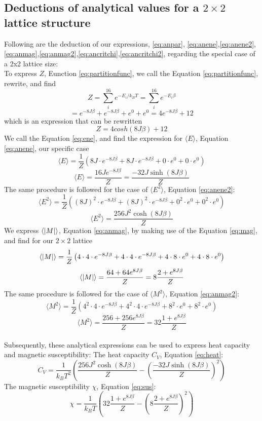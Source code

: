 \documentclass[10pt, nofootinbib, twocolumn]{revtex4-1}
\begin{document}
\subsection{Deductions of analytical values for a $2\times 2$ lattice structure}
Following are the deduction of our expressions, \eqref{eq:anpar}, \eqref{eq:anene},\eqref{eq:anene2},\eqref{eq:anmag},\eqref{eq:anmag2},\eqref{eq:ancritchi},\eqref{eq:ancritchi2}, regarding the special case of a 2x2 lattice size: \\
To express \(Z\), Eunction \eqref{eq:partitionfunc},  we call the Equation \eqref{eq:partitionfunc}, rewrite, and find 
\[Z = \sum_{i}^{16}e^{-E_i/k_BT} = \sum_{i}^{16}e^{-E_i\beta}\]
\[=e^{-8J\beta} + e^{-8J\beta} + e^{0} + e^{0} = 4e^{-8J\beta} + 12\]
which is an expression that can be rewritten 
\[Z=4cosh(8J\beta)+12\]
We call the Equation \eqref{eq:ene}, and find the expression for \(\langle E \rangle\), Equation \eqref{eq:anene}, our specific case
\[\langle E \rangle = \frac{1}{Z}\left(8J \cdot e^{-8J\beta} + 8J \cdot e^{-8J\beta} + 0 \cdot e^{0} + 0 \cdot e^{0}\right)\]
\[\langle E \rangle = \frac{16J e^{-8J\beta}}{Z} = \frac{-32J\sinh{\left(8J\beta\right)}}{Z}\]
The same procedure is followed for the case of \(\langle E^2 \rangle\), Equation \eqref{eq:anene2}:\\
\[\langle E^2 \rangle = \frac{1}{Z}\left((8J)^2 \cdot e^{-8J\beta} + (8J)^2 \cdot e^{-8J\beta} + 0^2 \cdot e^{0} + 0^2 \cdot e^{0}\right)\]
\[\langle E^2 \rangle = \frac{256J^2\cosh{\left(8J\beta\right)}}{Z}\]
We express \(\langle \abs{M} \rangle\), Equation \eqref{eq:anmag}, by making use of the Equation \eqref{eq:mag}, and find for our \(2\times 2\) lattice 
\[\langle \abs{M} \rangle = \frac{1}{Z}\left(4 \cdot 4 \cdot e^{-8J\beta} + 4 \cdot 4 \cdot e^{-8J\beta} + 4 \cdot 8 \cdot e^{0} + 4 \cdot 8 \cdot e^{0}\right)\]
\[\langle \abs{M} \rangle = \frac{64 + 64e^{8J\beta}}{Z} = 8\frac{2 + e^{8J\beta}}{Z}\]
The same procedure is followed for the case of \(\langle M^2 \rangle\), Equation \eqref{eq:anmag2}:\\
\[\langle M^2 \rangle = \frac{1}{Z}\left(4^2 \cdot 4 \cdot e^{-8J\beta} + 4^2 \cdot 4 \cdot e^{-8J\beta} + 8^2 \cdot e^{0} + 8^2 \cdot e^{0}\right)\]
\[\langle M^2 \rangle = \frac{256 + 256e^{8J\beta}}{Z} = 32\frac{1 + e^{8J\beta}}{Z}\] \\
Subsequently, these analytical expressions can be used to express heat capacity and magnetic susceptibility: 
The heat capacity \(C_V\), Equation \eqref{eq:heat}:
\[C_V = \frac{1}{k_B T^2}\left(\frac{256J^2\cosh{\left( 8J\beta \right)}}{Z} - \left(\frac{-32J\sinh{\left( 8J\beta \right)}}{Z}\right)^2\right)\]
The magnetic susceptibility \(\chi\), Equation \eqref{eq:sus}:
\[\chi = \frac{1}{k_B T}\left(32\frac{1+e^{8J\beta}}{Z} - \left(8\frac{2+e^{8J\beta}}{Z}\right)^2\right)\]
\end{document}
